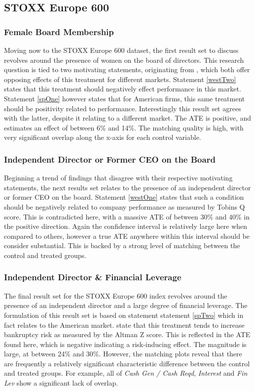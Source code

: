 \subsection{STOXX Europe 600}
\subsubsection{Female Board Membership}
{Moving now to the STOXX Europe 600 dataset, the first result set to discuss revolves around the presence of women on the board of directors. This research question is tied to two motivating statements, originating from \cite{moldovan2015learning}, which both offer opposing effects of this treatment for different markets. Statement \ref{westTwo} states that this treatment should negatively effect performance in this market. Statement \ref{spOne} however states that for American firms, this same treatment should be positivity related to performance. Interestingly this result set agrees with the latter, despite it relating to a different market. The ATE is positive, and estimates an effect of between 6\% and 14\%. The matching quality is high, with very significant overlap along the x-axis for each control variable.}
\subsubsection{Independent Director or Former CEO on the Board}
{Beginning a trend of findings that disagree with their respective motivating statements, the next results set relates to the presence of an independent director or former CEO on the board. Statement \ref{westOne} states that such a condition should be negatively related to company performance as measured by Tobins Q score. This is contradicted here, with a massive ATE of between 30\% and 40\% in the positive direction. Again the confidence interval is relatively large here when compared to others, however a true ATE anywhere within this interval should be consider substantial. This is backed by a strong level of matching between the control and treated groups. }
\subsubsection{Independent Director \& Financial Leverage}
{The final result set for the STOXX Europe 600 index revolves around the presence of an independent director and a large degree of financial leverage. The formulation of this result set is based on statement statement \ref{spTwo} which in fact relates to the American market. \cite{moldovan2015learning} state that this treatment tends to increase bankruptcy risk as measured by the Altman Z score. This is reflected in the ATE found here, which is negative indicating a risk-inducing effect. The magnitude is large, at between 24\% and 30\%. However, the matching plots reveal that there are frequently a relatively significant characteristic difference between the control and treated groups. For example, all of {\it Cash Gen / Cash Reqd}, {\it Interest} and {\it Fin Lev} show a significant lack of overlap. }

